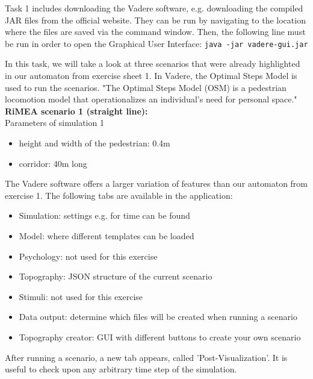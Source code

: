 Task 1 includes downloading the Vadere \cite{vadere} software, e.g. downloading the compiled JAR files from the official website. They can be run by navigating to the location where the files are saved via the command window. Then, the following line must be run in order to open the Graphical User Interface: \texttt{java -jar vadere-gui.jar}

In this task, we will take a look at three scenarios that were already highlighted in our automaton from exercise sheet 1. In Vadere, the Optimal Steps Model is used to run the scenarios. "The Optimal Steps Model (OSM) is a pedestrian locomotion model that operationalizes an individual’s need for personal space." \cite{mayr2022social} \\ 


\textbf{RiMEA scenario 1 (straight line):}\\
Parameters of simulation 1
\begin{itemize}
    \item height and width of the pedestrian: 0.4m 
    \item corridor: 40m long 
\end{itemize}

The Vadere software offers a larger variation of features than our automaton from exercise 1. The following tabs are available in the application: 

\begin{itemize}
    \item Simulation: settings e.g. for time can be found
    \item Model: where different templates can be loaded
    \item Psychology: not used for this exercise
    \item Topography: JSON structure of the current scenario
    \item Stimuli: not used for this exercise
    \item Data output: determine which files will be created when running a scenario
    \item Topography creator: GUI with different buttons to create your own scenario
\end{itemize}

After running a scenario, a new tab appears, called 'Post-Visualization'. It is useful to check upon any arbitrary time step of the simulation.

